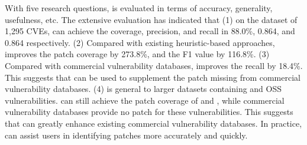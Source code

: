 \begin{abstract*}
With five research questions, \tool is evaluated in terms of accuracy, generality, usefulness, etc. The extensive evaluation has indicated that (1) on the dataset of 1,295 CVEs, \tool can achieve the coverage, precision, and recall in 88.0\%, 0.864, and 0.864 respectively. (2) Compared with existing heuristic-based approaches, \tool improves the patch coverage by 273.8\%, and the F1 value by 116.8\%. (3) Compared with commercial vulnerability databases, \tool improves the recall by 18.4\%. This suggests that \tool can be used to supplement the patch missing from commercial vulnerability databases. (4) \tool is general to larger datasets containing  and  OSS vulnerabilities. \tool can still achieve the patch coverage of  and , while commercial vulnerability databases provide no patch for these vulnerabilities. This suggests that \tool can greatly enhance existing commercial vulnerability databases. In practice, \tool can assist users in identifying patches more accurately and quickly.
\end{abstract*}